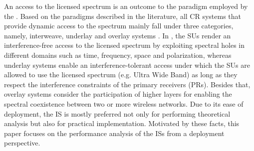 An access to the licensed spectrum is an outcome to the paradigm employed by the . Based on the paradigms described in the literature, all CR systems that provide dynamic access to the spectrum mainly fall under three categories, namely, interweave, underlay and overlay systems \cite{Goldsmith09}. In , the SUs render an interference-free access to the licensed spectrum by exploiting spectral holes in different domains such as time, frequency, space and polarization, whereas underlay systems enable an interference-tolerant access under which the SUs are allowed to use the licensed spectrum (e.g. Ultra Wide Band) as long as they respect the interference constraints of the primary receivers (PRs). Besides that, overlay systems consider the participation of higher layers for enabling the spectral coexistence between two or more wireless networks. Due to its ease of deployment, the IS is mostly preferred not only for performing theoretical analysis but also for practical implementation. Motivated by these facts, this paper focuses on the performance analysis of the ISs from a deployment perspective. 






